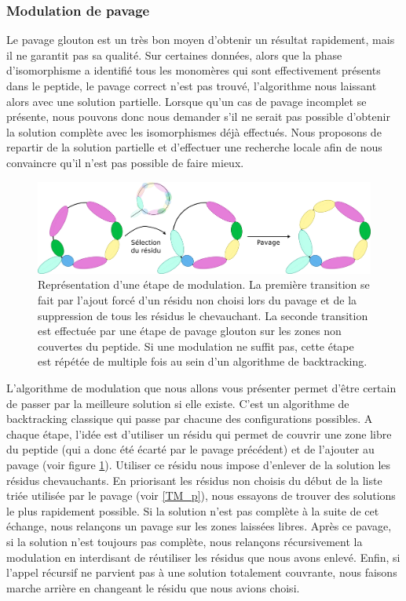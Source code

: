 \subsubsection{Modulation de pavage}

Le pavage glouton est un très bon moyen d'obtenir un résultat rapidement, mais il ne garantit pas sa qualité.
Sur certaines données, alors que la phase d'isomorphisme a identifié tous les monomères qui sont effectivement présents dans le peptide, le pavage correct n'est pas trouvé, l'algorithme nous laissant alors avec une solution partielle.
Lorsque qu'un cas de pavage incomplet se présente, nous pouvons donc nous demander s'il ne serait pas possible d'obtenir la solution complète avec les isomorphismes déjà effectués.
Nous proposons de repartir de la solution partielle et d'effectuer une recherche locale afin de nous convaincre qu'il n'est pas possible de faire mieux.

\begin{figure}[!ht]
  \begin{center}
    \includegraphics[width=450px]{Figures/s2m/pavage/modulation.png}
    \caption{\label{modulation}Représentation d'une étape de modulation.
    La première transition se fait par l'ajout forcé d'un résidu non choisi lors du pavage et de la suppression de tous les résidus le chevauchant.
    La seconde transition est effectuée par une étape de pavage glouton sur les zones non couvertes du peptide.
    Si une modulation ne suffit pas, cette étape est répétée de multiple fois au sein d'un algorithme de backtracking.}
  \end{center}
\end{figure}

L'algorithme de modulation que nous allons vous présenter permet d'être certain de passer par la meilleure solution si elle existe.
C'est un algorithme de backtracking classique qui passe par chacune des configurations possibles.
A chaque étape, l'idée est d'utiliser un résidu qui permet de couvrir une zone libre du peptide (qui a donc été écarté par le pavage précédent) et de l'ajouter au pavage (voir figure \ref{modulation}).
Utiliser ce résidu nous impose d'enlever de la solution les résidus chevauchants.
En priorisant les résidus non choisis du début de la liste triée utilisée par le pavage (voir \ref{TM_p}), nous essayons de trouver des solutions le plus rapidement possible.
Si la solution n'est pas complète à la suite de cet échange, nous relançons un pavage sur les zones laissées libres.
Après ce pavage, si la solution n'est toujours pas complète, nous relançons récursivement la modulation en interdisant de réutiliser les résidus que nous avons enlevé.
Enfin, si l'appel récursif ne parvient pas à une solution totalement couvrante, nous faisons marche arrière en changeant le résidu que nous avions choisi.

